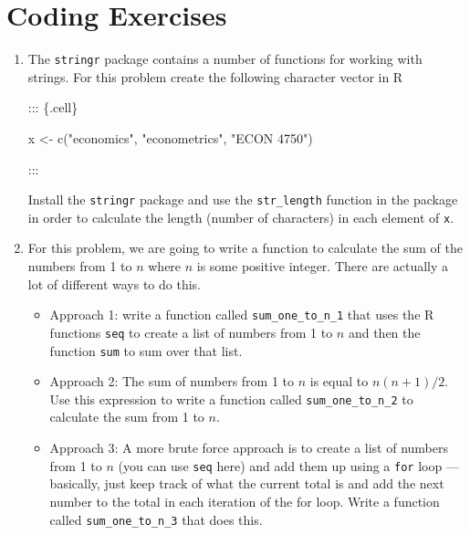 \documentclass[
  letterpaper,
  DIV=11,
  numbers=noendperiod]{scrreprt}
\newenvironment{Shaded}{\begin{snugshade}}{\end{snugshade}}
\newcommand{\FunctionTok}[1]{\textcolor[rgb]{0.28,0.35,0.67}{#1}}
\newcommand{\NormalTok}[1]{\textcolor[rgb]{0.00,0.23,0.31}{#1}}
\newcommand{\OtherTok}[1]{\textcolor[rgb]{0.00,0.23,0.31}{#1}}
\newcommand{\StringTok}[1]{\textcolor[rgb]{0.13,0.47,0.30}{#1}}
\begin{document}
\section{Coding Exercises}\label{coding-exercises}

\begin{enumerate}
\def\labelenumi{\arabic{enumi}.}
\item
  The \texttt{stringr} package contains a number of functions for
  working with strings. For this problem create the following character
  vector in R

  ::: \{.cell\}

\begin{Shaded}
\begin{Highlighting}[]
\NormalTok{x }\OtherTok{\textless{}{-}} \FunctionTok{c}\NormalTok{(}\StringTok{"economics"}\NormalTok{, }\StringTok{"econometrics"}\NormalTok{, }\StringTok{"ECON 4750"}\NormalTok{)}
\end{Highlighting}
\end{Shaded}

  :::

  Install the \texttt{stringr} package and use the \texttt{str\_length}
  function in the package in order to calculate the length (number of
  characters) in each element of \texttt{x}.
\item
  For this problem, we are going to write a function to calculate the
  sum of the numbers from 1 to \(n\) where \(n\) is some positive
  integer. There are actually a lot of different ways to do this.

  \begin{itemize}
  \item
    Approach 1: write a function called \texttt{sum\_one\_to\_n\_1} that
    uses the R functions \texttt{seq} to create a list of numbers from 1
    to \(n\) and then the function \texttt{sum} to sum over that list.
  \item
    Approach 2: The sum of numbers from 1 to \(n\) is equal to
    \(n(n+1)/2\). Use this expression to write a function called
    \texttt{sum\_one\_to\_n\_2} to calculate the sum from 1 to \(n\).\\
  \item
    Approach 3: A more brute force approach is to create a list of
    numbers from 1 to \(n\) (you can use \texttt{seq} here) and add them
    up using a \texttt{for} loop --- basically, just keep track of what
    the current total is and add the next number to the total in each
    iteration of the for loop. Write a function called
    \texttt{sum\_one\_to\_n\_3} that does this.
  \end{itemize}


\end{enumerate}
\end{document}

